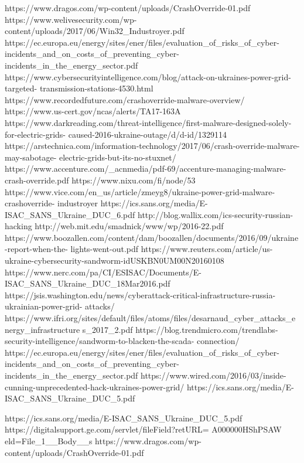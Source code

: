 https://www.dragos.com/wp-content/uploads/CrashOverride-01.pdf
https://www.welivesecurity.com/wp-content/uploads/2017/06/Win32_Industroyer.pdf
https://ec.europa.eu/energy/sites/ener/files/evaluation_of_risks_of_cyber-
incidents_and_on_costs_of_preventing_cyber-incidents_in_the_energy_sector.pdf
https://www.cybersecurityintelligence.com/blog/attack-on-ukraines-power-grid-targeted-
transmission-stations-4530.html
https://www.recordedfuture.com/crashoverride-malware-overview/
https://www.us-cert.gov/ncas/alerts/TA17-163A
https://www.darkreading.com/threat-intelligence/first-malware-designed-solely-for-electric-grids-
caused-2016-ukraine-outage/d/d-id/1329114
https://arstechnica.com/information-technology/2017/06/crash-override-malware-may-sabotage-
electric-grids-but-its-no-stuxnet/
https://www.accenture.com/_acnmedia/pdf-69/accenture-managing-malware-crash-override.pdf
https://www.nixu.com/fi/node/53
https://www.vice.com/en_us/article/zmeyg8/ukraine-power-grid-malware-crashoverride-
industroyer
https://ics.sans.org/media/E-ISAC_SANS_Ukraine_DUC_6.pdf
http://blog.wallix.com/ics-security-russian-hacking
http://web.mit.edu/smadnick/www/wp/2016-22.pdf
https://www.boozallen.com/content/dam/boozallen/documents/2016/09/ukraine-report-when-the-
lights-went-out.pdf
https://www.reuters.com/article/us-ukraine-cybersecurity-sandworm-idUSKBN0UM00N20160108
https://www.nerc.com/pa/CI/ESISAC/Documents/E-ISAC_SANS_Ukraine_DUC_18Mar2016.pdf
https://jsis.washington.edu/news/cyberattack-critical-infrastructure-russia-ukrainian-power-grid-
attacks/
https://www.ifri.org/sites/default/files/atoms/files/desarnaud_cyber_attacks_energy_infrastructure
s_2017_2.pdf
https://blog.trendmicro.com/trendlabs-security-intelligence/sandworm-to-blacken-the-scada-
connection/
https://ec.europa.eu/energy/sites/ener/files/evaluation_of_risks_of_cyber-
incidents_and_on_costs_of_preventing_cyber-incidents_in_the_energy_sector.pdf
https://www.wired.com/2016/03/inside-cunning-unprecedented-hack-ukraines-power-grid/
https://ics.sans.org/media/E-ISAC_SANS_Ukraine_DUC_5.pdf

https://ics.sans.org/media/E-ISAC_SANS_Ukraine_DUC_5.pdf
https://digitalsupport.ge.com/servlet/fileField?retURL=%
A000000HShPSAW%
eld=File_1__Body__s
https://www.dragos.com/wp-content/uploads/CrashOverride-01.pdf

